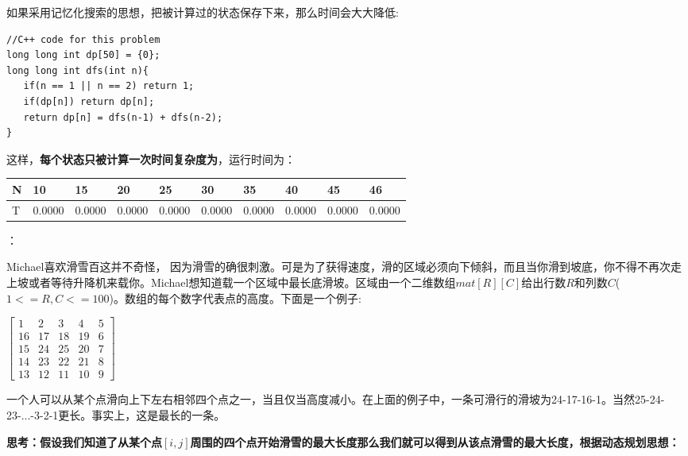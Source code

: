 \documentclass[a4paper,10pt]{article}
\begin{document}
\begin{CJK}{UTF8}{gbsn}
如果采用记忆化搜索的思想，把被计算过的状态保存下来，那么时间会大大降低:
\begin{lstlisting}
//C++ code for this problem
long long int dp[50] = {0};
long long int dfs(int n){
   if(n == 1 || n == 2) return 1;
   if(dp[n]) return dp[n];
   return dp[n] = dfs(n-1) + dfs(n-2);
}
\end{lstlisting}\par
这样，\textbf{每个状态只被计算一次时间复杂度为}，运行时间为：
\begin{center}
    \begin{tabular}{| l | l | l | l | l | l | l | l | l  | p{1cm} |}   \hline
    N & 10 & 15 & 20 & 25 & 30 & 35 & 40 & 45 & 46 \\ \hline
    T & 0.0000 &  0.0000 & 0.0000 & 0.0000 & 0.0000 & 0.0000 & 0.0000 & 0.0000 & 0.0000 \\ \hline
    \end{tabular}
\end{center}
：\begin{CJK}{UTF8}{gkai}Michael喜欢滑雪百这并不奇怪， 因为滑雪的确很刺激。可是为了获得速度，滑的区域必须向下倾斜，而且当你滑到坡底，你不得不再次走上坡或者等待升降机来载你。Michael想知道载一个区域中最长底滑坡。区域由一个二维数组$mat[R][C]$给出行数$R$和列数$C$($1 <= R,C <= 100$)。数组的每个数字代表点的高度。下面是一个例子:\par
\begin{center}     %
$\left[                 %
  \begin{array}{ccccc}   %
    1 & 2 & 3 & 4 & 5 \\
	16 & 17 & 18 & 19 & 6 \\
    15 & 24 & 25 & 20 & 7 \\
	14 & 23 & 22 & 21 & 8 \\
	13 & 12 & 11 & 10 & 9
  \end{array}
\right]$                 %
\end{center}
一个人可以从某个点滑向上下左右相邻四个点之一，当且仅当高度减小。在上面的例子中，一条可滑行的滑坡为24-17-16-1。当然25-24-23-...-3-2-1更长。事实上，这是最长的一条。\end{CJK}\par
\textbf{思考：假设我们知道了从某个点$[i,j]$周围的四个点开始滑雪的最大长度那么我们就可以得到从该点滑雪的最大长度，根据动态规划思想：}\par
\begin{center}

\end{center}
\end{CJK}
\end{document}
